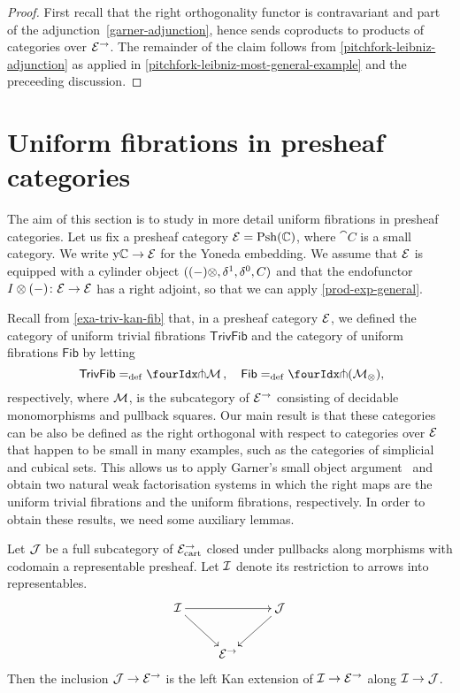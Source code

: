 \documentclass[reqno,10pt,a4paper,oneside,draft]{amsart}
\begin{document}
\begin{proof}
First recall that the right orthogonality functor is contravariant and part of the adjunction~\eqref{garner-adjunction}, hence sends coproducts to products of categories over $\cal{E}^\to$.
The remainder of the claim follows from \cref{pitchfork-leibniz-adjunction} as applied in \cref{pitchfork-leibniz-most-general-example} and the preceeding discussion.
\end{proof}


\section{Uniform fibrations in presheaf categories}
\label{sec:exinwf}

\newcommand{\Psh}{\mathrm{Psh}}

The aim of this section is to study in more detail uniform fibrations in presheaf categories.
Let us fix a presheaf category $\catE = \Psh(\cat{C})$, where $\cat{C}$ is a small category.
We write $\yon \catC \to \cal{E}$ for the Yoneda embedding.
We assume that $\cal{E}$ is equipped with a cylinder object $( (-)\otimes, \rcyl, \lcyl, \cyl)$ and that the endofunctor $ \interval\otimes (-) \co \cal{E} \to \cal{E}$ has a right adjoint, so that we can apply \cref{prod-exp-general}.



Recall from \cref{exa-triv-kan-fib} that, in a presheaf category $\cal{E}$, we defined the category of uniform trivial fibrations
$\mathsf{TrivFib}$ and the category of uniform fibrations $\mathsf{Fib}$ by letting
\[
\mathsf{TrivFib} \defeq \liftr{\cal{M}} \, , \quad \mathsf{Fib} \defeq \liftr{(\cal{M}_\otimes)} \rlap{,}
\]
respectively, where $\cal{M}$, is the subcategory of $\cal{E}^\to$ consisting of decidable monomorphisms and pullback squares.
Our main result is that these categories can be also be defined as the right orthogonal with respect to categories over
$\cal{E}$ that happen to be small in many examples, such as the categories of simplicial and cubical sets.
This allows us to apply Garner's small object argument~\cite{garner:small-object-argument} and obtain two natural weak factorisation systems in which the right maps are the uniform trivial fibrations and the uniform fibrations, respectively.
In order to obtain these results, we need some auxiliary lemmas.

\begin{lemma} \label{left-kan-extension-of-representables}
Let $\cal{J}$ be a full subcategory of $\catE_{\cart}^\to$ closed under pullbacks along morphisms with codomain a representable presheaf.
Let $\cal{I}$ denote its restriction to arrows into representables.
\[
\xymatrix{
  \cal{I}
  \ar[rr]
  \ar[dr]
&&
  \cal{J}
  \ar[dl]
\\&
  \catE^\to
}
\]
Then the inclusion $\cal{J} \to \catE^\to$ is the left Kan extension of $\cal{I} \to \catE^\to$ along $\cal{I} \to \cal{J}$.
\end{lemma}
\end{document}
